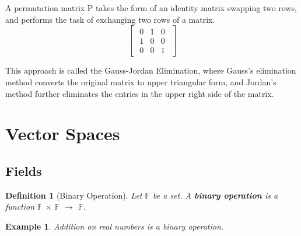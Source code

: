 \documentclass{article}
\newtheorem{definition}{Definition}[section] %
\newtheorem{example}{Example}[section]
\begin{document}
A permutation matrix P takes the form of an identity matrix swapping two rows, and performs the task of exchanging two rows of a matrix.
\begin{equation}
    \begin{bmatrix}
        \begin{array}{ccc}
            0 & 1 & 0 \\
            1 & 0 & 0 \\
            0 & 0 & 1
        \end{array}
    \end{bmatrix}
\end{equation}

This approach is called the Gauss-Jordan Elimination, where Gauss's elimination method converts the original matrix to upper triangular form, and Jordan's method further eliminates the entries in the upper right side of the matrix.





\newpage
\section{Vector Spaces}
\subsection{Fields}
\begin{definition}[Binary Operation]
    Let $\mathbb{F}$ be a set. A \textbf{binary operation} is a function $\mathbb{F}$ $\times$ $\mathbb{F}$ $\rightarrow$ $\mathbb{F}$.
\end{definition}
\begin{example}
    Addition on real numbers is a binary operation.
\end{example}
\end{document}
